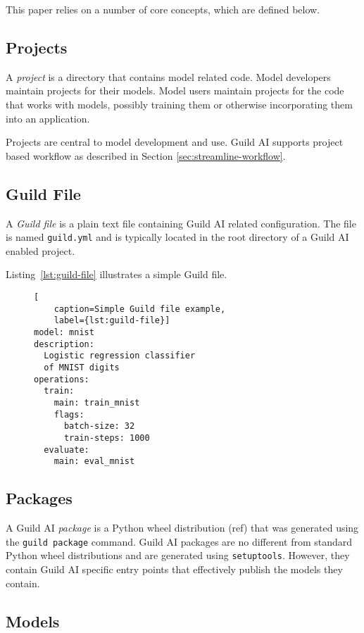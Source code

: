 \documentclass{article}
\begin{document}
This paper relies on a number of core concepts, which are defined
below.

\subsection{Projects}

A \emph{project} is a directory that contains model related
code. Model developers maintain projects for their models. Model users
maintain projects for the code that works with models, possibly
training them or otherwise incorporating them into an application.

Projects are central to model development and use. Guild AI supports
project based workflow as described in Section
\ref{sec:streamline-workflow}.

\subsection{Guild File}

A \emph{Guild file} is a plain text file containing Guild AI related
configuration. The file is named \verb|guild.yml| and is typically
located in the root directory of a Guild AI enabled project.

Listing~\ref{lst:guild-file} illustrates a simple Guild file.

\begin{figure}
\begin{lstlisting}[
    caption=Simple Guild file example,
    label={lst:guild-file}]
model: mnist
description:
  Logistic regression classifier
  of MNIST digits
operations:
  train:
    main: train_mnist
    flags:
      batch-size: 32
      train-steps: 1000
  evaluate:
    main: eval_mnist
\end{lstlisting}
\end{figure}

\subsection{Packages}

A Guild AI \emph{package} is a Python wheel distribution (ref) that
was generated using the \verb|guild package| command. Guild AI
packages are no different from standard Python wheel distributions and
are generated using \verb|setuptools|. However, they contain Guild AI
specific entry points that effectively publish the models they
contain.

\subsection{Models}
\end{document}
